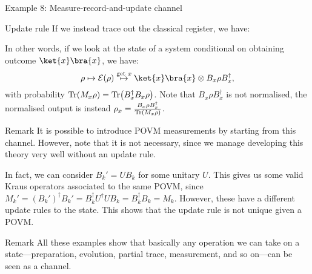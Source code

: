 \documentclass[a4paper]{article}
\begin{document}
\begin{parag}{Example 8: Measure-record-and-update channel}
    \begin{subparag}{Update rule}
        If we instead trace out the classical register, we have: 
        
        In other words, if we look at the state of a system conditional on obtaining outcome $\ket{x}\bra{x}$, we have: 
        \[\rho \mapsto \mathcal{E}\left(\rho\right) \over{\mapsto}{get $x$} \ket{x}\bra{x} \otimes B_x \rho B_x^{\dagger},\]
        with probability $\Tr\left(M_x \rho\right) = \Tr\left(B_x^{\dagger} B_x \rho\right)$. Note that $B_x \rho B_x^{\dagger}$ is not normalised, the normalised output is instead $\rho_x = \frac{B_x \rho B_x^{\dagger}}{\Tr\left(M_x \rho\right)}$.
    \end{subparag}

    \begin{subparag}{Remark}
        It is possible to introduce POVM measurements by starting from this channel. However, note that it is not necessary, since we manage developing this theory very well without an update rule.

        In fact, we can consider $B_k' = U B_k$ for some unitary $U$. This gives us some valid Kraus operators associated to the same POVM, since $M_k' = \left(B_k'\right)^{\dagger} B_k' = B_k^{\dagger} U^{\dagger} U B_k = B_k^{\dagger} B_k = M_k$. However, these have a different update rules to the state. This shows that the update rule is not unique given a POVM.
    \end{subparag}
\end{parag}

\begin{parag}{Remark}
    All these examples show that basically any operation we can take on a state---preparation, evolution, partial trace, measurement, and so on---can be seen as a channel.
\end{parag}
\end{document}
